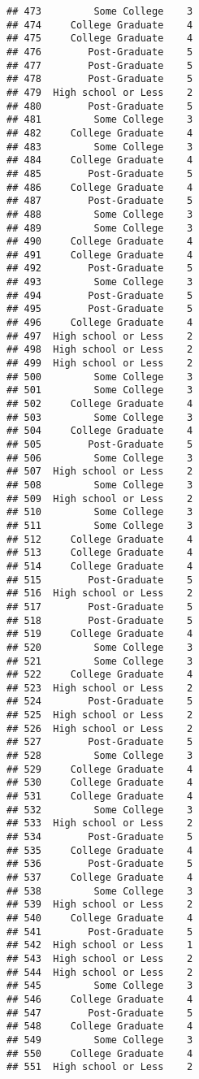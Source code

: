 \documentclass[
]{article}
\begin{document}
\begin{verbatim}
## 473         Some College    3
## 474     College Graduate    4
## 475     College Graduate    4
## 476        Post-Graduate    5
## 477        Post-Graduate    5
## 478        Post-Graduate    5
## 479  High school or Less    2
## 480        Post-Graduate    5
## 481         Some College    3
## 482     College Graduate    4
## 483         Some College    3
## 484     College Graduate    4
## 485        Post-Graduate    5
## 486     College Graduate    4
## 487        Post-Graduate    5
## 488         Some College    3
## 489         Some College    3
## 490     College Graduate    4
## 491     College Graduate    4
## 492        Post-Graduate    5
## 493         Some College    3
## 494        Post-Graduate    5
## 495        Post-Graduate    5
## 496     College Graduate    4
## 497  High school or Less    2
## 498  High school or Less    2
## 499  High school or Less    2
## 500         Some College    3
## 501         Some College    3
## 502     College Graduate    4
## 503         Some College    3
## 504     College Graduate    4
## 505        Post-Graduate    5
## 506         Some College    3
## 507  High school or Less    2
## 508         Some College    3
## 509  High school or Less    2
## 510         Some College    3
## 511         Some College    3
## 512     College Graduate    4
## 513     College Graduate    4
## 514     College Graduate    4
## 515        Post-Graduate    5
## 516  High school or Less    2
## 517        Post-Graduate    5
## 518        Post-Graduate    5
## 519     College Graduate    4
## 520         Some College    3
## 521         Some College    3
## 522     College Graduate    4
## 523  High school or Less    2
## 524        Post-Graduate    5
## 525  High school or Less    2
## 526  High school or Less    2
## 527        Post-Graduate    5
## 528         Some College    3
## 529     College Graduate    4
## 530     College Graduate    4
## 531     College Graduate    4
## 532         Some College    3
## 533  High school or Less    2
## 534        Post-Graduate    5
## 535     College Graduate    4
## 536        Post-Graduate    5
## 537     College Graduate    4
## 538         Some College    3
## 539  High school or Less    2
## 540     College Graduate    4
## 541        Post-Graduate    5
## 542  High school or Less    1
## 543  High school or Less    2
## 544  High school or Less    2
## 545         Some College    3
## 546     College Graduate    4
## 547        Post-Graduate    5
## 548     College Graduate    4
## 549         Some College    3
## 550     College Graduate    4
## 551  High school or Less    2

\end{verbatim}
\end{document}
